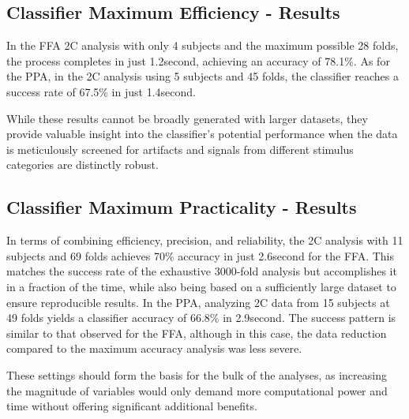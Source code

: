 \subsection{Classifier Maximum Efficiency - Results}

In the \gls{FFA} \gls{2C} analysis with only 4 subjects and the maximum possible 28 folds, the process completes in just 1.2\si{second}, achieving an accuracy of 78.1\%. As for the \gls{PPA}, in the \gls{2C} analysis using 5 subjects and 45 folds, the classifier reaches a success rate of 67.5\% in just 1.4\si{second}.

While these results cannot be broadly generated with larger datasets, they provide valuable insight into the classifier's potential performance when the data is meticulously screened for artifacts and signals from different stimulus categories are distinctly robust.

\subsection{Classifier Maximum Practicality - Results}

In terms of combining efficiency, precision, and reliability, the \gls{2C} analysis with 11 subjects and 69 folds achieves 70\% accuracy in just 2.6\si{second} for the \gls{FFA}. This matches the success rate of the exhaustive 3000-fold analysis but accomplishes it in a fraction of the time, while also being based on a sufficiently large dataset to ensure reproducible results. In the \gls{PPA}, analyzing \gls{2C} data from 15 subjects at 49 folds yields a classifier accuracy of 66.8\% in 2.9\si{second}. The success pattern is similar to that observed for the \gls{FFA}, although in this case, the data reduction compared to the maximum accuracy analysis was less severe.

These settings should form the basis for the bulk of the analyses, as increasing the magnitude of variables would only demand more computational power and time without offering significant additional benefits.